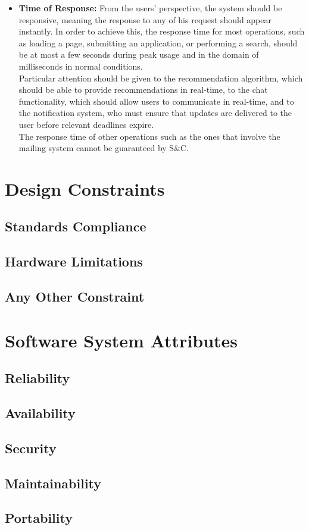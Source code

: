 \begin{itemize}
    \item \textbf{Time of Response:} From the users' perspective, the system should be responsive, meaning the response to any of his request 
    should appear instantly. In order to achieve this, the response time for most operations, such as loading a page, submitting an application, 
    or performing a search, should be at most a few seconds during peak usage and in the domain of milliseconds in normal conditions. \\
    Particular attention should be given to the recommendation algorithm, which should be able to provide recommendations in real-time,
    to the chat functionality, which should allow users to communicate in real-time, and to the notification system, who must ensure that
    updates are delivered to the user before relevant deadlines expire. \\
    The response time of other operations such as the ones that involve the mailing system cannot be guaranteed by S\&C.

\end{itemize}

\section{Design Constraints}

\subsection{Standards Compliance}
\subsection{Hardware Limitations}
\subsection{Any Other Constraint}

\section{Software System Attributes}
\subsection{Reliability}
\subsection{Availability}
\subsection{Security}
\subsection{Maintainability}
\subsection{Portability}
